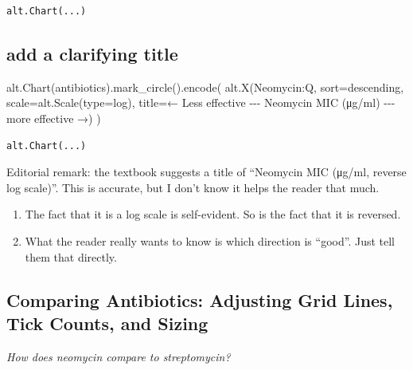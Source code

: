 \documentclass[
  letterpaper,
  DIV=11,
  numbers=noendperiod]{scrartcl}
\newenvironment{Shaded}{\begin{snugshade}}{\end{snugshade}}
\newcommand{\BuiltInTok}[1]{\textcolor[rgb]{0.00,0.23,0.31}{#1}}
\newcommand{\NormalTok}[1]{\textcolor[rgb]{0.00,0.23,0.31}{#1}}
\newcommand{\OperatorTok}[1]{\textcolor[rgb]{0.37,0.37,0.37}{#1}}
\newcommand{\StringTok}[1]{\textcolor[rgb]{0.13,0.47,0.30}{#1}}
\providecommand{\tightlist}{%
  \setlength{\itemsep}{0pt}\setlength{\parskip}{0pt}}\usepackage{longtable,booktabs,array}
\begin{document}
\begin{verbatim}
alt.Chart(...)
\end{verbatim}

\subsection{add a clarifying title}\label{add-a-clarifying-title}

\begin{Shaded}
\begin{Highlighting}[]
\NormalTok{alt.Chart(antibiotics).mark\_circle().encode(}
\NormalTok{    alt.X(}\StringTok{\textquotesingle{}Neomycin:Q\textquotesingle{}}\NormalTok{,}
\NormalTok{          sort}\OperatorTok{=}\StringTok{\textquotesingle{}descending\textquotesingle{}}\NormalTok{,}
\NormalTok{          scale}\OperatorTok{=}\NormalTok{alt.Scale(}\BuiltInTok{type}\OperatorTok{=}\StringTok{\textquotesingle{}log\textquotesingle{}}\NormalTok{),}
\NormalTok{          title}\OperatorTok{=}\StringTok{\textquotesingle{}← Less effective {-}{-}{-} Neomycin MIC (μg/ml) {-}{-}{-} more effective →\textquotesingle{}}\NormalTok{)}
\NormalTok{)}
\end{Highlighting}
\end{Shaded}

\begin{verbatim}
alt.Chart(...)
\end{verbatim}

Editorial remark: the textbook suggests a title of ``Neomycin MIC
(μg/ml, reverse log scale)''. This is accurate, but I don't know it
helps the reader that much.

\begin{enumerate}
\def\labelenumi{\arabic{enumi}.}
\tightlist
\item
  The fact that it is a log scale is self-evident. So is the fact that
  it is reversed.
\item
  What the reader really wants to know is which direction is ``good''.
  Just tell them that directly.
\end{enumerate}

\subsection{Comparing Antibiotics: Adjusting Grid Lines, Tick Counts,
and
Sizing}\label{comparing-antibiotics-adjusting-grid-lines-tick-counts-and-sizing}

\emph{How does neomycin compare to streptomycin?}
\end{document}
